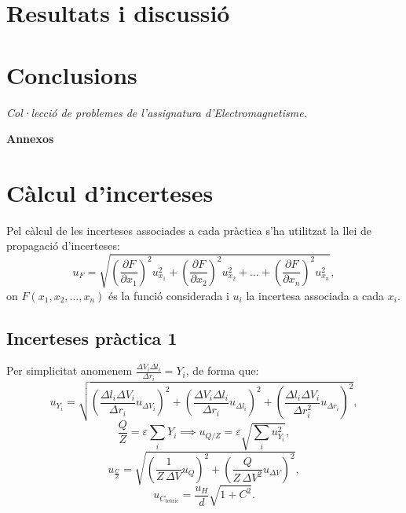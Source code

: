 \documentclass[a4paper,10.5pt]{report}
\begin{document}
\section{Resultats i discussió}

\section{Conclusions}


\begin{thebibliography}{99}
	\textit{Col·lecció de problemes de l'assignatura d'Electromagnetisme.}
\end{thebibliography}

\newpage
\begin{appendices}

\textbf{\Huge{Annexos}}
\renewcommand{\thesection}{\Alph{section}} %
\renewcommand{\theequation}{\thesection.\arabic{equation}} %
\setcounter{equation}{0} %

\section{Càlcul d'incerteses}
\label{an:a3}
Pel càlcul de les incerteses associades a cada pràctica s'ha utilitzat la llei de propagació d'incerteses:
\begin{equation}
	u_F = \sqrt{ \left( \frac{\partial F}{\partial x_1} \right)^2 u_{x_1}^2 + \left( \frac{\partial F}{\partial x_2} \right)^2 u_{x_2}^2 + \dots + \left( \frac{\partial F}{\partial x_n} \right)^2 u_{x_n}^2 },
\end{equation}
on $F(x_1,x_2,\ldots,x_n)$ és la funció considerada i $u_i$ la incertesa associada a cada $x_i$.

\subsection{Incerteses pràctica 1}
Per simplicitat anomenem $\frac{\Delta V_i \Delta l_i}{\Delta r_i} = Y_i$, de forma que:
\begin{equation}
	u_{Y_i} = \sqrt{ \left( \frac{\Delta l_i \Delta V_i}{\Delta r_i} u_{\Delta V_i} \right)^2 + \left( \frac{\Delta V_i \Delta l_i}{\Delta r_i} u_{\Delta l_i} \right)^2 + \left( \frac{\Delta l_i \Delta V_i}{\Delta r_i^2} u_{\Delta r_i} \right)^2 },
\end{equation}
\begin{equation}
	\frac{Q}{Z} = \varepsilon \sum_i Y_i \implies u_{Q/Z} = \varepsilon \sqrt{\sum_i u_{Y_i}^2},
\end{equation}
\begin{equation}
	u_{\frac{C}{Z}} = \sqrt{ \left( \frac{1}{Z \, \Delta V} u_Q \right)^2 + \left( \frac{Q}{Z \, \Delta V^2} u_{\Delta V} \right)^2 },
\end{equation}
\begin{equation}
	u_{C_\text{teòric}} = \frac{u_H}{d} \sqrt{1+C^2}.
\end{equation}



\end{appendices}
\end{document}
